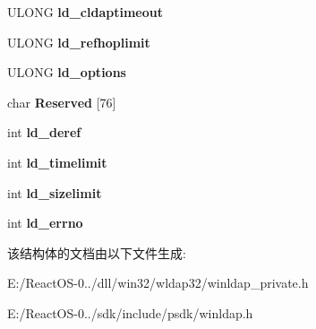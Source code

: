 \begin{DoxyCompactItemize}
U\+L\+O\+NG {\bfseries ld\+\_\+cldaptimeout}
\item 
\mbox{\label{structldap_aeb76256d300f01389aadcd05ecdffe9e}} 
U\+L\+O\+NG {\bfseries ld\+\_\+refhoplimit}
\item 
\mbox{\label{structldap_a562986886ff8dde47bf1865ac8c9a27b}} 
U\+L\+O\+NG {\bfseries ld\+\_\+options}
\item 
\mbox{\label{structldap_a1c805127fb7f98cb23bcd90d8acd588d}} 
char {\bfseries Reserved} \mbox{[}76\mbox{]}
\item 
\mbox{\label{structldap_a3415f1aeb9969c72e42cc7724c05b6df}} 
int {\bfseries ld\+\_\+deref}
\item 
\mbox{\label{structldap_a991ea058948760343759dec39c5d3412}} 
int {\bfseries ld\+\_\+timelimit}
\item 
\mbox{\label{structldap_ada73c649dba9b9f363f017cff2126b40}} 
int {\bfseries ld\+\_\+sizelimit}
\item 
\mbox{\label{structldap_ac5ab9f9e944d61e3c79799682c6d942a}} 
int {\bfseries ld\+\_\+errno}
\end{DoxyCompactItemize}


该结构体的文档由以下文件生成\+:\begin{DoxyCompactItemize}
\item 
E\+:/\+React\+O\+S-\/0../dll/win32/wldap32/winldap\+\_\+private.\+h\item 
E\+:/\+React\+O\+S-\/0../sdk/include/psdk/winldap.\+h\end{DoxyCompactItemize}
